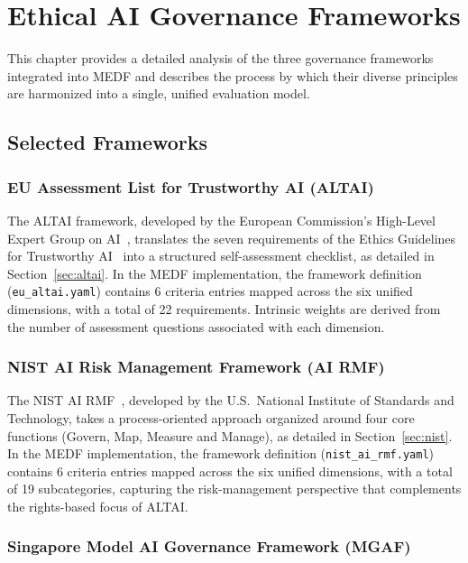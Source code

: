 \chapter{Ethical AI Governance Frameworks}
\label{ch:frameworks}

This chapter provides a detailed analysis of the three governance frameworks integrated into MEDF and describes the process by which their diverse principles are harmonized into a single, unified evaluation model.

\section{Selected Frameworks}
\label{sec:selected}

\subsection{EU Assessment List for Trustworthy AI (ALTAI)}
\label{sec:altai_detail}

The ALTAI framework, developed by the European Commission's High-Level Expert Group on AI~\cite{aihleg2020altai}, translates the seven requirements of the Ethics Guidelines for Trustworthy AI~\cite{aihleg2019ethics} into a structured self-assessment checklist, as detailed in Section~\ref{sec:altai}. In the MEDF implementation, the framework definition (\texttt{eu\_altai.yaml}) contains 6 criteria entries mapped across the six unified dimensions, with a total of 22 requirements. Intrinsic weights are derived from the number of assessment questions associated with each dimension.

\subsection{NIST AI Risk Management Framework (AI RMF)}
\label{sec:nist_detail}

The NIST AI RMF~\cite{nist2023rmf}, developed by the U.S.\ National Institute of Standards and Technology, takes a process-oriented approach organized around four core functions (Govern, Map, Measure and Manage), as detailed in Section~\ref{sec:nist}. In the MEDF implementation, the framework definition (\texttt{nist\_ai\_rmf.yaml}) contains 6 criteria entries mapped across the six unified dimensions, with a total of 19 subcategories, capturing the risk-management perspective that complements the rights-based focus of ALTAI.

\subsection{Singapore Model AI Governance Framework (MGAF)}
\label{sec:mgaf_detail}

